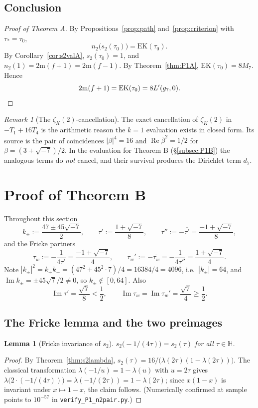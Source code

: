 \documentclass[11pt]{article}
\newtheorem{lemma}[theorem]{Lemma}
\theoremstyle{definition}
\theoremstyle{remark}
\newtheorem{remark}[theorem]{Remark}
\newcommand{\Hh}{\mathbb{H}}
\newcommand{\ImT}{\operatorname{Im}}
\newcommand{\ReT}{\operatorname{Re}}
\newcommand{\m}{\mathrm{m}}
\begin{document}
\subsection{Conclusion}

\begin{proof}[Proof of Theorem A]
By Propositions~\ref{prop:path} and~\ref{prop:criterion} with
$\tau_*=\tau_0$,
\[
  n_2\bigl(s_2(\tau_0)\bigr)=\mathrm{EK}(\tau_0).
\]
By Corollary~\ref{cor:s2valA}, $s_2(\tau_0)=1$, and
$n_2(1)=2\m(f+1)=2\m(f-1)$. By Theorem~\ref{thm:P1A},
$\mathrm{EK}(\tau_0)=8M_7$. Hence
\[
  2\m(f+1)=\mathrm{EK}(\tau_0)=8L'(g_7,0). \qedhere
\]
\end{proof}

\begin{remark}[The $\zeta_K(2)$-cancellation]
The exact cancellation of $\zeta_K(2)$ in $-T_1+16T_4$ is the arithmetic
reason the $k=1$ evaluation exists in closed form. Its source is the pair
of coincidences $|\beta|^4=16$ and $\ReT\bar\beta^2=1/2$ for
$\beta=(3+\sqrt{-7})/2$. In the evaluation for Theorem B
(\S\ref{subsec:P1B}) the analogous terms do \emph{not} cancel, and their
survival produces the Dirichlet term $d_7$.
\end{remark}

\section{Proof of Theorem B}\label{sec:thmB}

Throughout this section
\[
  k_\pm:=\frac{47\pm45\sqrt{-7}}2,\qquad
  \tau':=\frac{1+\sqrt{-7}}8,\qquad
  \tau'':=-\overline{\tau'}=\frac{-1+\sqrt{-7}}8,
\]
and the Fricke partners
\[
  \tau_w:=-\frac1{4\tau'}=\frac{-1+\sqrt{-7}}4,\qquad
  \tau_w':=-\overline{\tau_w}=-\frac1{4\tau''}=\frac{1+\sqrt{-7}}4 .
\]
Note $|k_\pm|^2=k_+k_-=(47^2+45^2\cdot7)/4=16384/4=4096$, i.e.\
$|k_\pm|=64$, and $\ImT k_\pm=\pm45\sqrt7/2\neq0$, so
$k_\pm\notin[0,64]$. Also
\begin{equation}\label{eq:ims}
  \ImT\tau'=\frac{\sqrt7}8<\frac12,\qquad
  \ImT\tau_w=\ImT\tau_w'=\frac{\sqrt7}4\ge\frac12 .
\end{equation}

\subsection{The Fricke lemma and the two preimages}\label{subsec:Bexact}

\begin{lemma}[Fricke invariance of $s_2$]\label{lem:fricke}
$s_2\bigl(-1/(4\tau)\bigr)=s_2(\tau)$ for all $\tau\in\Hh$.
\end{lemma}
\begin{proof}
By Theorem~\ref{thm:s2lambda},
$s_2(\tau)=16/\bigl(\lambda(2\tau)(1-\lambda(2\tau))\bigr)$. The classical
transformation $\lambda(-1/u)=1-\lambda(u)$ with $u=2\tau$ gives
$\lambda\bigl(2\cdot(-1/(4\tau))\bigr)=\lambda(-1/(2\tau))=1-\lambda(2\tau)$;
since $x(1-x)$ is invariant under $x\mapsto1-x$, the claim follows.
(Numerically confirmed at sample points to $10^{-57}$ in
\texttt{verify\_P1\_n2pair.py}.)
\end{proof}
\end{document}
